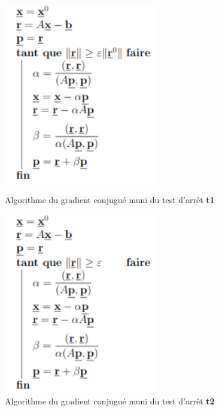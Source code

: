 \documentclass[12,french]{report}
\begin{document}
\begin{figure}[H]
    \begin{minipage}[c]{.45\linewidth}
        \centering
        \captionsetup{justification=centering}
        \includegraphics[width=0.6\textwidth]{./Images/Algo1}
		\caption{Algorithme du gradient conjugué muni du test d'arrêt \textbf{t1}}
    \end{minipage}
    \hfill%
    \begin{minipage}[c]{.45\linewidth}
        \centering
        \captionsetup{justification=centering}
        \includegraphics[width=0.6\textwidth]{./Images/Algo2}
		\caption{Algorithme du gradient conjugué muni du test d'arrêt \textbf{t2}}
    \end{minipage}
\end{figure}\vspace{0.3cm}
\end{document}
